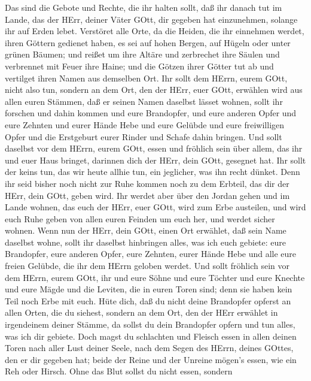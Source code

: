  Das sind die Gebote und Rechte, die ihr halten sollt, daß
ihr danach tut im Lande, das der HErr, deiner Väter GOtt, dir gegeben
hat einzunehmen, solange ihr auf Erden lebet.  Verstöret
alle Orte, da die Heiden, die ihr einnehmen werdet, ihren Göttern
gedienet haben, es sei auf hohen Bergen, auf Hügeln oder unter grünen
Bäumen;  und reißet um ihre Altäre und zerbrechet ihre
Säulen und verbrennet mit Feuer ihre Haine; und die Götzen ihrer Götter
tut ab und vertilget ihren Namen aus demselben Ort.  Ihr
sollt dem HErrn, eurem GOtt, nicht also tun,  sondern an dem
Ort, den der HErr, euer GOtt, erwählen wird aus allen euren Stämmen, daß
er seinen Namen daselbst lässet wohnen, sollt ihr forschen und dahin
kommen  und eure Brandopfer, und eure anderen Opfer und eure
Zehnten und eurer Hände Hebe und eure Gelübde und eure freiwilligen
Opfer und die Erstgeburt eurer Rinder und Schafe dahin bringen.
 Und sollt daselbst vor dem HErrn, eurem GOtt, essen und
fröhlich sein über allem, das ihr und euer Haus bringet, darinnen dich
der HErr, dein GOtt, gesegnet hat.  Ihr sollt der keins tun,
das wir heute allhie tun, ein jeglicher, was ihn recht dünket.
 Denn ihr seid bisher noch nicht zur Ruhe kommen noch zu dem
Erbteil, das dir der HErr, dein GOtt, geben wird.  Ihr
werdet aber über den Jordan gehen und im Lande wohnen, das euch der
HErr, euer GOtt, wird zum Erbe austeilen, und wird euch Ruhe geben von
allen euren Feinden um euch her, und werdet sicher wohnen. 
Wenn nun der HErr, dein GOtt, einen Ort erwählet, daß sein Name daselbst
wohne, sollt ihr daselbst hinbringen alles, was ich euch gebiete: eure
Brandopfer, eure anderen Opfer, eure Zehnten, eurer Hände Hebe und alle
eure freien Gelübde, die ihr dem HErrn geloben werdet.  Und
sollt fröhlich sein vor dem HErrn, eurem GOtt, ihr und eure Söhne und
eure Töchter und eure Knechte und eure Mägde und die Leviten, die in
euren Toren sind; denn sie haben kein Teil noch Erbe mit euch.
 Hüte dich, daß du nicht deine Brandopfer opferst an allen
Orten, die du siehest,  sondern an dem Ort, den der HErr
erwählet in irgendeinem deiner Stämme, da sollst du dein Brandopfer
opfern und tun alles, was ich dir gebiete.  Doch magst du
schlachten und Fleisch essen in allen deinen Toren nach aller Lust
deiner Seele, nach dem Segen des HErrn, deines GOttes, den er dir
gegeben hat; beide der Reine und der Unreine mögen's essen, wie ein Reh
oder Hirsch.  Ohne das Blut sollst du nicht essen, sondern
